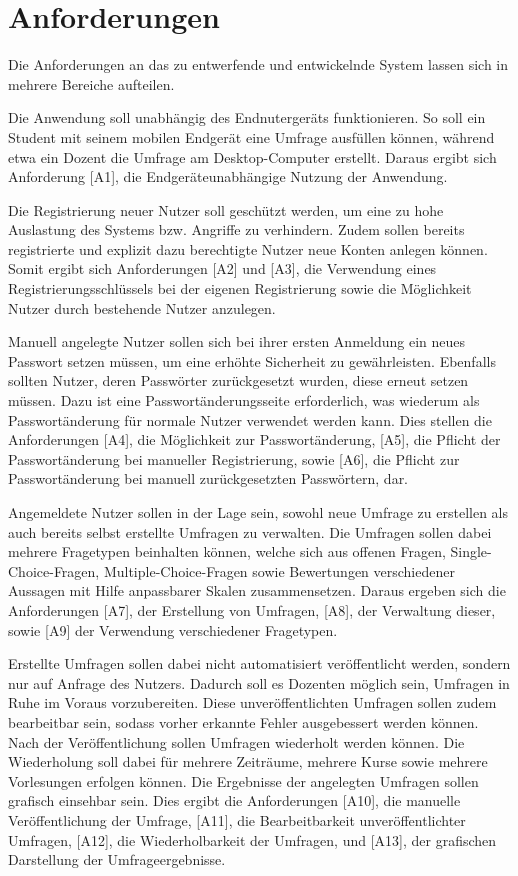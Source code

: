\section{Anforderungen}
\label{sec:Anforderungen}

Die Anforderungen an das zu entwerfende und entwickelnde System lassen sich in mehrere Bereiche aufteilen.

Die Anwendung soll unabhängig des Endnutergeräts funktionieren.
So soll ein Student mit seinem mobilen Endgerät eine Umfrage ausfüllen können, während etwa ein Dozent die Umfrage am Desktop-Computer erstellt.
Daraus ergibt sich Anforderung [A1], die Endgeräteunabhängige Nutzung der Anwendung.

Die Registrierung neuer Nutzer soll geschützt werden, um eine zu hohe Auslastung des Systems bzw. Angriffe zu verhindern.
Zudem sollen bereits registrierte und explizit dazu berechtigte Nutzer neue Konten anlegen können.
Somit ergibt sich Anforderungen [A2] und [A3], die Verwendung eines Registrierungsschlüssels bei der eigenen Registrierung sowie die Möglichkeit Nutzer durch bestehende Nutzer anzulegen.

Manuell angelegte Nutzer sollen sich bei ihrer ersten Anmeldung ein neues Passwort setzen müssen, um eine erhöhte Sicherheit zu gewährleisten.
Ebenfalls sollten Nutzer, deren Passwörter zurückgesetzt wurden, diese erneut setzen müssen.
Dazu ist eine Passwortänderungsseite erforderlich, was wiederum als Passwortänderung für normale Nutzer verwendet werden kann.
Dies stellen die Anforderungen [A4], die Möglichkeit zur Passwortänderung, [A5], die Pflicht der Passwortänderung bei manueller Registrierung, sowie [A6], die Pflicht zur Passwortänderung bei manuell zurückgesetzten Passwörtern, dar.

Angemeldete Nutzer sollen in der Lage sein, sowohl neue Umfrage zu erstellen als auch bereits selbst erstellte Umfragen zu verwalten.
Die Umfragen sollen dabei mehrere Fragetypen beinhalten können, welche sich aus offenen Fragen, Single-Choice-Fragen, Multiple-Choice-Fragen sowie Bewertungen verschiedener Aussagen mit Hilfe anpassbarer Skalen zusammensetzen.
Daraus ergeben sich die Anforderungen [A7], der Erstellung von Umfragen, [A8], der Verwaltung dieser, sowie [A9] der Verwendung verschiedener Fragetypen.

Erstellte Umfragen sollen dabei nicht automatisiert veröffentlicht werden, sondern nur auf Anfrage des Nutzers.
Dadurch soll es Dozenten möglich sein, Umfragen in Ruhe im Voraus vorzubereiten.
Diese unveröffentlichten Umfragen sollen zudem bearbeitbar sein, sodass vorher erkannte Fehler ausgebessert werden können.
Nach der Veröffentlichung sollen Umfragen wiederholt werden können.
Die Wiederholung soll dabei für mehrere Zeiträume, mehrere Kurse sowie mehrere Vorlesungen erfolgen können.
Die Ergebnisse der angelegten Umfragen sollen grafisch einsehbar sein.
Dies ergibt die Anforderungen [A10], die manuelle Veröffentlichung der Umfrage, [A11], die Bearbeitbarkeit unveröffentlichter Umfragen, [A12], die Wiederholbarkeit der Umfragen, und [A13], der grafischen Darstellung der Umfrageergebnisse.

